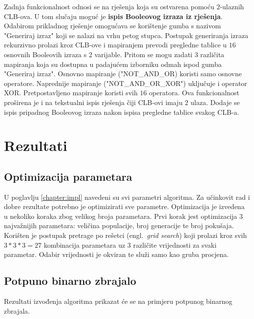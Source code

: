 \documentclass[times, utf8, diplomski]{fer}
\begin{document}
Zadnja funkcionalnost odnosi se na rješenja koja su ostvarena pomoću $2$-ulaznih CLB-ova. U tom slučaju moguć je \textbf{ispis Booleovog izraza iz rješenja}. Odabirom prikladnog rješenje omogućava se korištenje gumba s nazivom "Generiraj izraz" koji se nalazi na vrhu petog stupca. Postupak generiranja izraza rekurzivno prolazi kroz CLB-ove i mapiranjem prevodi pregledne tablice u $16$ osnovnih Booleovih izraza s $2$ varijable. Pritom se mogu zadati $3$ različita mapiranja koja su dostupna u padajućem izborniku odmah ispod gumba "Generiraj izraz". Osnovno mapiranje ("NOT\_AND\_OR) koristi samo osnovne operatore. Naprednije mapiranje ("NOT\_AND\_OR\_XOR") uključuje i operator XOR. Pretpostavljeno mapiranje koristi svih $16$ operatora. Ova funkcionalnost proširena je i na tekstualni ispis rješenja čiji CLB-ovi imaju $2$ ulaza. Dodaje se ispis pripadnog Booleovog izraza nakon ispisa pregledne tablice svakog CLB-a.


\chapter{Rezultati} \label{chapter:results}


\section{Optimizacija parametara}

U poglavlju \ref{chapter:impl} navedeni su svi parametri algoritma. Za učinkovit rad i dobre rezultate potrebno je optimizirati sve parametre. Optimizacija je izvedena u nekoliko koraka zbog velikog broja parametara. Prvi korak jest optimizacija $3$ najvažnijih parametara: veličina populacije, broj generacije te broj pokušaja. Korišten je postupak pretrage po rešetci (engl.~\textit{grid search}) koji prolazi kroz svih $3*3*3=27$ kombinacija parametara uz $3$ različite vrijednosti za svaki parametar. Odabir vrijednosti je okviran te služi samo kao gruba procjena.




\section{Potpuno binarno zbrajalo}

Rezultati izvođenja algoritma prikazat će se na primjeru potpunog binarnog zbrajala.
\end{document}
